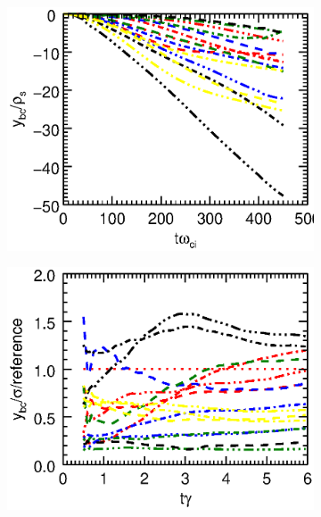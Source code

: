 \documentclass[9pt,twocolumn]{article}
\renewcommand{\=}[1]{\stackrel{#1}{=}} %
\theoremstyle{definition}
\theoremstyle{remark}
\begin{document}
\begin{figure}
\begin{subfigure}{.49\textwidth}
	\includegraphics[trim={115mm 88mm 1mm 7mm},clip,width=1\linewidth]{Pictures/posygrpewiitgt.eps}
\end{subfigure}
\begin{subfigure}{.49\textwidth}
	\centering
	\includegraphics[trim={115mm 88mm 1mm 7mm},clip,width=1\linewidth]{Pictures/ynormgrpewiitgt.eps}
\end{subfigure}
\end{figure}
\end{document}
